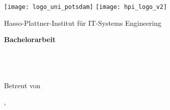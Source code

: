 \begin{titlepage}

\centering
\sffamily

\texttt{[image: logo\_uni\_potsdam]}
\hspace{2.5cm}
\texttt{[image: hpi\_logo\_v2]}
\vspace*{0.75cm}

\textsf{\Large Hasso-Plattner-Institut f\"ur IT-Systems Engineering}\\

\vspace{2cm}

\LARGE
\textbf{Bachelorarbeit}\\[0.5\baselineskip]
\Huge
\textbf{\docTitle}\\[0.5\baselineskip]
\Large
\docAuthor\\[0.5\baselineskip]
{\normalsize \docAuthorMail}\\

\vfill

\large
Betreut von \docSupervisited
\\[1.0\baselineskip]
\docChair

\vspace{1cm}
\textsf{\docCity{}, \docDate}\\ %
\end{titlepage}
